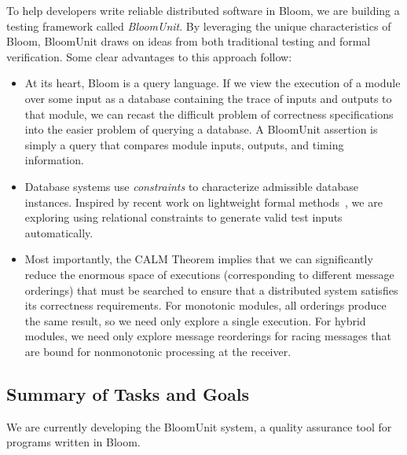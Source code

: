 To help developers write reliable distributed software in Bloom, we are building
a testing framework called \emph{BloomUnit}. By leveraging the unique
characteristics of Bloom, BloomUnit draws on ideas from both traditional testing
and formal verification. Some clear advantages to this approach follow:

\begin{itemize}
\item
  At its heart, Bloom is a query language.  If we view the execution of a module
  over some input as a database containing the trace of inputs and outputs to
  that module, we can recast the difficult problem of correctness specifications
  into the easier problem of querying a database. A BloomUnit assertion is
  simply a query that compares module inputs, outputs, and timing information.

\item
  Database systems use \emph{constraints} to characterize admissible database
  instances.  Inspired by recent work on lightweight formal
  methods~\cite{Jackson2012}, we are exploring using relational constraints to
  generate valid test inputs automatically.

\item
  Most importantly, the CALM Theorem implies that we can significantly reduce
  the enormous space of executions (corresponding to different message
  orderings) that must be searched to ensure that a distributed system satisfies
  its correctness requirements.  For monotonic modules, all orderings produce
  the same result, so we need only explore a single execution.  For hybrid
  modules, we need only explore message reorderings for racing messages that are
  bound for nonmonotonic processing at the receiver.
\end{itemize}



\subsection{Summary of Tasks and Goals}

We are currently developing the BloomUnit system, a quality assurance tool
for programs written in Bloom.  

